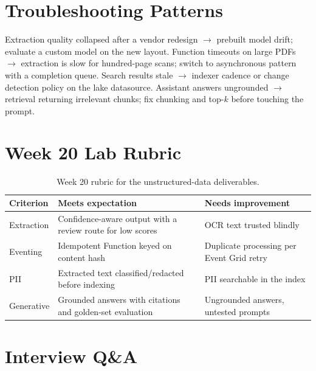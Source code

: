 \section{Troubleshooting Patterns}
Extraction quality collapsed after a vendor redesign $\rightarrow$ prebuilt model drift; evaluate a custom model on the new layout. Function timeouts on large PDFs $\rightarrow$ extraction is slow for hundred-page scans; switch to asynchronous pattern with a completion queue. Search results stale $\rightarrow$ indexer cadence or change detection policy on the lake datasource. Assistant answers ungrounded $\rightarrow$ retrieval returning irrelevant chunks; fix chunking and top-$k$ before touching the prompt.

\section{Week 20 Lab Rubric}
\begin{table}[H]
\centering
\small
\begin{tabular}{@{}p{3.2cm}p{5.0cm}p{5.0cm}@{}}
\toprule
\textbf{Criterion} & \textbf{Meets expectation} & \textbf{Needs improvement} \\
\midrule
Extraction & Confidence-aware output with a review route for low scores & OCR text trusted blindly \\
Eventing & Idempotent Function keyed on content hash & Duplicate processing per Event Grid retry \\
PII & Extracted text classified/redacted before indexing & PII searchable in the index \\
Generative & Grounded answers with citations and golden-set evaluation & Ungrounded answers, untested prompts \\
\bottomrule
\end{tabular}
\caption{Week 20 rubric for the unstructured-data deliverables.}
\label{tab:ch20-rubric}
\end{table}

\section{Interview Q\&A}
